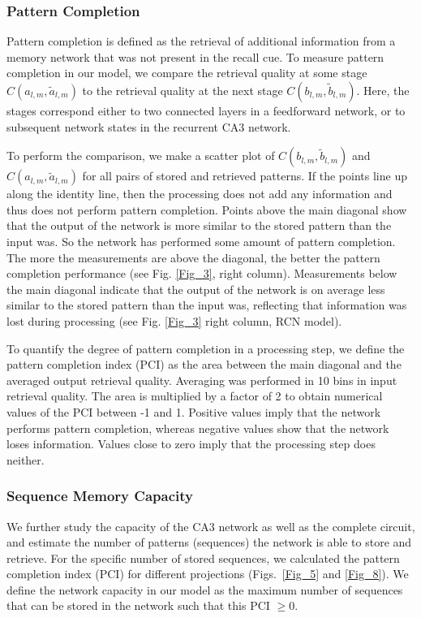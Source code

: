 \documentclass[utf8]{frontiersSCNS} %
\begin{document}
\subsubsection{Pattern Completion}
Pattern completion is defined as the retrieval of additional information from a memory network that was not present in the recall cue. To measure pattern completion in our model, we compare the retrieval quality at some stage $C(a_{l, m},\tilde{a}_{l, m})$ to the retrieval quality at the next stage $C(b_{l, m},\tilde{b}_{l, m})$. Here, the stages correspond either to two connected layers in a feedforward network, or to subsequent network states in the recurrent CA3 network. 

%
To perform the comparison, we make a scatter plot of
$C(b_{l, m},\tilde{b}_{l, m})$ and
$C(a_{l, m},\tilde{a}_{l, m})$ 
for all pairs of stored and retrieved patterns.
If the points line up along the identity line, then the processing does not add any information and thus does not perform pattern completion. Points above the main diagonal show that the output of the network is more similar to the stored pattern than the input was. So the network has performed some amount of pattern completion. The more the measurements are above the diagonal, the better the pattern completion performance (see Fig. \ref{Fig_3}, right column). Measurements below the main diagonal indicate that the output of the network is on average less similar to the stored pattern than the input was, reflecting that information was lost during processing (see Fig. \ref{Fig_3} right column, RCN model).

To quantify the degree of pattern completion in a processing step, we define the pattern completion index (PCI) as the area between the main diagonal and the averaged output retrieval quality. Averaging was performed in 10 bins in input retrieval quality. The area is multiplied by a factor of 2 to obtain numerical values of the PCI between -1 and 1. Positive values imply that the network performs pattern completion, whereas negative values show that the network loses information. Values close to zero imply that the processing step does neither. 

\subsubsection{Sequence Memory Capacity}
We further study the capacity of the CA3 network as well as the complete circuit, and estimate the number of patterns (sequences) the network is able to store and retrieve. For the specific number of stored sequences, we calculated the pattern completion index (PCI) for different projections (Figs.~\ref{Fig_5} and \ref{Fig_8}). 
We define the network capacity in our model as the maximum number of sequences that can be stored in the network such that this PCI $\geq 0$.
\end{document}
